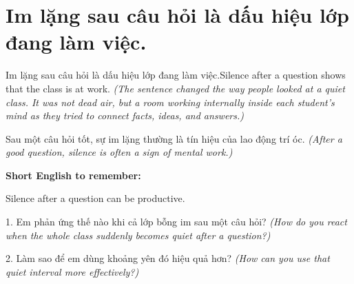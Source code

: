 \section{Im lặng sau câu hỏi là dấu hiệu lớp đang làm việc.}
\begin{truyen}{Im lặng sau câu hỏi là dấu hiệu lớp đang làm việc.}{Silence after a question shows that the class is at work.}
\textit{(The sentence changed the way people looked at a quiet class. It was not dead air, but a room working internally inside each student's mind as they tried to connect facts, ideas, and answers.)}
\end{truyen}

\begin{baihoc}
Sau một câu hỏi tốt, sự im lặng thường là tín hiệu của lao động trí óc.
\textit{(After a good question, silence is often a sign of mental work.)}
\end{baihoc}

\begin{ghinhoanh}
\textbf{Short English to remember:}

Silence after a question can be productive.

\end{ghinhoanh}

\begin{tuhocnhanh}
1. Em phản ứng thế nào khi cả lớp bỗng im sau một câu hỏi? \textit{(How do you react when the whole class suddenly becomes quiet after a question?)}

2. Làm sao để em dùng khoảng yên đó hiệu quả hơn? \textit{(How can you use that quiet interval more effectively?)}
\end{tuhocnhanh}
\ngancach

